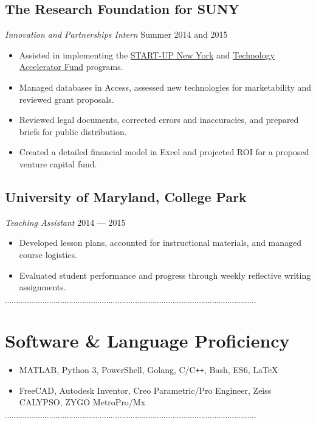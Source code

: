 \documentclass[10pt]{article}
\newcommand{\dotfringe}{
    \begin{center}
      $\cdots\cdots\cdots\cdots\cdots\cdots\cdots\cdots\cdots\cdots\cdots\cdots\cdots\cdots\cdots\cdots\cdots\cdots\cdots\cdots\cdots\cdots\cdots\cdots\cdots\cdots\cdots\cdots\cdots\cdots\cdots\cdots\cdots\cdots\cdots\cdots\cdots\cdots$
    \end{center}
}
\begin{document}
\subsection*{The Research Foundation for SUNY}
\textit{Innovation and Partnerships Intern} \hfill Summer 2014 and 2015
\begin{itemize}
  \item Assisted in implementing the \href{https://startup.ny.gov/}{START-UP New York} and \href{https://www.rfsuny.org/Our-Work/Innovation-and-Partnerships/Programs/Technology-Accelerator-Fund/}{Technology Accelerator Fund} programs.
  \item Managed databases in Access, assessed new technologies for marketability and reviewed grant proposals.
  \item Reviewed legal documents, corrected errors and inaccuracies, and prepared briefs for public distribution.
  \item Created a detailed financial model in Excel and projected ROI for a proposed venture capital fund.
\end{itemize}
\subsection*{University of Maryland, College Park}
\textit{Teaching Assistant} \hfill 2014 --- 2015
\begin{itemize}
  \item Developed lesson plans, accounted for instructional materials, and managed course logistics.
  \item Evaluated student performance and progress through weekly reflective writing assignments.
\end{itemize}
\dotfringe{}
\section*{Software \& Language Proficiency}
\begin{itemize}
  \item MATLAB, Python 3, PowerShell, Golang, C/C\texttt{++}, Bash, ES6, \LaTeX
  \item FreeCAD, Autodesk Inventor, Creo Parametric/Pro Engineer, Zeiss CALYPSO, ZYGO MetroPro/Mx
\end{itemize}

\dotfringe{}
\end{document}
